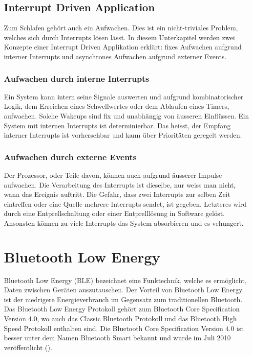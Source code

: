 \subsection{Interrupt Driven Application}\label{pm_interrupt}

Zum Schlafen gehört auch ein Aufwachen. Dies ist ein nicht-triviales Problem, welches sich durch Interrupts lösen lässt. In diesem Unterkapitel werden zwei Konzepte einer Interrupt Driven Applikation erklärt: fixes Aufwachen aufgrund interner Interrupts und asynchrones Aufwachen aufgrund externer Events.

\subsubsection{Aufwachen durch interne Interrupts}

Ein System kann intern seine Signale auswerten und aufgrund kombinatorischer Logik, dem Erreichen eines Schwellwertes oder dem Ablaufen eines Timers, aufwachen. Solche Wakeups sind fix und unabhängig von äusseren Einflüssen. Ein System mit internen Interrupts ist determinierbar. Das heisst, der Empfang interner Interrupts ist vorhersehbar und kann über Prioritäten geregelt werden.

\subsubsection{Aufwachen durch externe Events}

Der Prozessor, oder Teile davon, können auch aufgrund äusserer Impulse aufwachen. Die Verarbeitung des Interrupts ist dieselbe, nur weiss man nicht, wann das Ereignis auftritt. Die Gefahr, dass zwei Interrupts zur selben Zeit eintreffen oder eine Quelle mehrere Interrupts sendet, ist gegeben. Letzteres wird durch eine Entprellschaltung oder einer Entprelllösung in Software gelöst. Ansonsten können zu viele Interrupts das System absorbieren und es \glqq vehungert\grqq.

\section{Bluetooth Low Energy}\label{t_ble} 

Bluetooth Low Energy (BLE) bezeichnet eine Funktechnik, welche es ermöglicht, Daten zwischen Geräten auszutauschen. Der Vorteil von Bluetooth Low Energy ist der niedrigere Energieverbrauch im Gegensatz zum traditionellen Bluetooth. Das Bluetooth Low Energy Protokoll gehört zum Bluetooth Core Specification Version 4.0, wo auch das Classic Bluetooth Protokoll und das Bluetooth High Speed Protokoll enthalten sind. Die Bluetooth Core Specification Version 4.0 ist besser unter dem Namen Bluetooth Smart bekannt und wurde im Juli 2010 veröffentlicht (\cite{youtube_BLE}).

